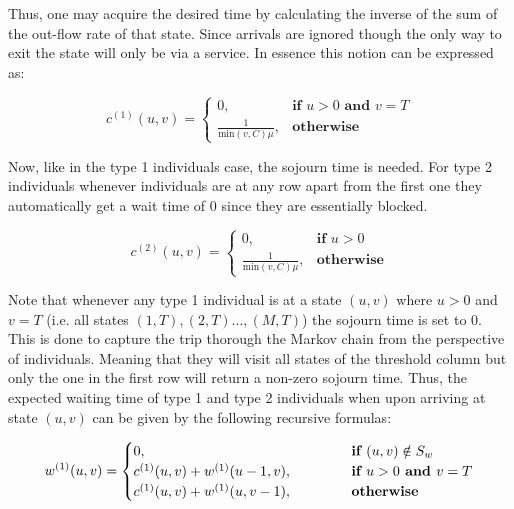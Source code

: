 Thus, one may acquire the desired time by calculating the inverse of the sum of 
the out-flow rate of that state. 
Since arrivals are ignored though the only way to exit the state will only be 
via a service. 
In essence this notion can be expressed as:

\begin{equation} \label{eq:sojourn_type_1}
    c^{(1)}(u,v) = 
    \begin{cases}
        0, & \textbf{if } u > 0 \textbf{ and } v = T \\
        \frac{1}{\text{min}(v,C)\mu}, & \textbf{otherwise}
    \end{cases}
\end{equation}

Now, like in the type 1 individuals case, the sojourn time is needed. 
For type 2 individuals whenever individuals are at any row apart from the 
first one they automatically get a wait time of \(0\) since they are essentially 
blocked.

\begin{equation} \label{eq:sojourn_type_2}
    c^{(2)}(u,v) = 
    \begin{cases}
        0, & \textbf{if } u > 0 \\
        \frac{1}{\text{min}(v,C)\mu}, & \textbf{otherwise}
    \end{cases}
\end{equation}

Note that whenever any type 1 individual is at a state \((u,v)\) where 
\(u > 0\) 
and \(v = T\) (i.e. all states \((1,T), (2,T) \dots, (M,T)\)) the sojourn time is 
set to \(0\). 
This is done to capture the trip thorough the Markov chain from the perspective 
of individuals. 
Meaning that they will visit all states of the threshold column but only the one 
in the first row will return a non-zero sojourn time.
Thus, the expected waiting time of type 1 and type 2 individuals when upon
arriving at state \( (u,v) \) can be given by the following recursive formulas:

\begin{equation} \label{eq:waiting_time_at_each_state_type_1}
    w^{(1)}(u,v) = 
    \begin{cases} 
        0, \hspace{4.85cm} & \textbf{if } (u,v) \notin S_w \\
        c^{(1)}(u,v) + w^{(1)}(u-1, v), & \textbf{if } u > 0 \textbf{ and } v = T \\
        c^{(1)}(u,v) + w^{(1)}(u, v-1), & \textbf{otherwise}
    \end{cases}
\end{equation}

